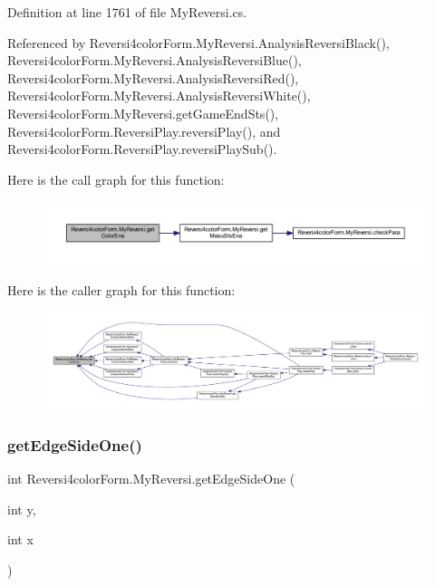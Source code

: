Definition at line 1761 of file My\+Reversi.\+cs.



Referenced by Reversi4color\+Form.\+My\+Reversi.\+Analysis\+Reversi\+Black(), Reversi4color\+Form.\+My\+Reversi.\+Analysis\+Reversi\+Blue(), Reversi4color\+Form.\+My\+Reversi.\+Analysis\+Reversi\+Red(), Reversi4color\+Form.\+My\+Reversi.\+Analysis\+Reversi\+White(), Reversi4color\+Form.\+My\+Reversi.\+get\+Game\+End\+Sts(), Reversi4color\+Form.\+Reversi\+Play.\+reversi\+Play(), and Reversi4color\+Form.\+Reversi\+Play.\+reversi\+Play\+Sub().

Here is the call graph for this function\+:
\nopagebreak
\begin{figure}[H]
\begin{center}
\leavevmode
\includegraphics[width=350pt]{class_reversi4color_form_1_1_my_reversi_a5c18ae70cd8a10fee96f44e3a0e8621b_cgraph}
\end{center}
\end{figure}
Here is the caller graph for this function\+:
\nopagebreak
\begin{figure}[H]
\begin{center}
\leavevmode
\includegraphics[width=350pt]{class_reversi4color_form_1_1_my_reversi_a5c18ae70cd8a10fee96f44e3a0e8621b_icgraph}
\end{center}
\end{figure}
\mbox{\label{class_reversi4color_form_1_1_my_reversi_abf9583e4d29970acf85e662eb8a273dc}} 
\subsubsection{\texorpdfstring{get\+Edge\+Side\+One()}{getEdgeSideOne()}}
{\footnotesize\ttfamily int Reversi4color\+Form.\+My\+Reversi.\+get\+Edge\+Side\+One (\begin{DoxyParamCaption}\item[{int}]{y,  }\item[{int}]{x }\end{DoxyParamCaption})}



